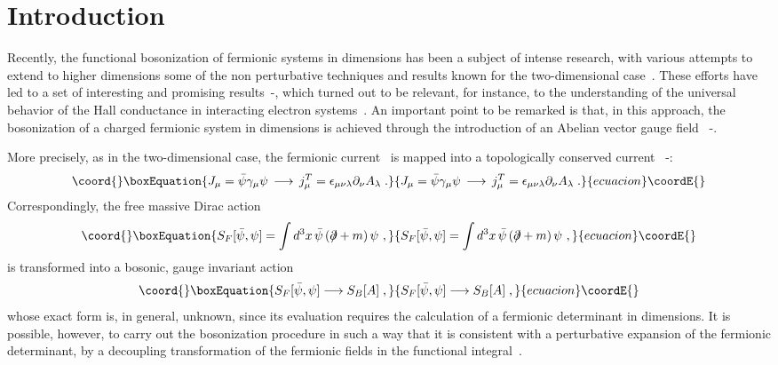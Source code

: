\documentclass[a4paper,12pt]{article}
\begin{document}
\section{Introduction}
Recently, the functional bosonization of fermionic systems in \coordHE{}
dimensions has been a subject of intense research, with various
attempts to extend to higher dimensions some of the non perturbative
techniques and results known for the two-dimensional case~\cite{2b}.
These efforts have led to a set of interesting and promising
results~\cite{result1}-\cite{result6}, which turned out to be
relevant, for instance, to the understanding of the universal behavior
of the Hall conductance in interacting electron systems~\cite{bo}. An
important point to be remarked is that, in this approach, the
bosonization of a charged fermionic system in \mbox{\coordHE{}}
dimensions is achieved through the introduction of an Abelian vector
gauge field \coordHE{}~\cite{result1}-\cite{result7}.

More precisely, as in the two-dimensional case, the \coordHE{} fermionic
current~\mbox{\coordHE{}} is mapped into a topologically
conserved current \coordHE{}~\cite{result1}-\cite{result6}:
\begin{equation}\coord{}\boxEquation{
 \label{bos-curr}
J_\mu =\bar{\psi}\gamma_\mu \psi \,\longrightarrow \,j_\mu^T
=\epsilon_{\mu \nu \lambda}\partial _\nu A_\lambda \;.
}{
 J_\mu =\bar{\psi}\gamma_\mu \psi \,\longrightarrow \,j_\mu^T
=\epsilon_{\mu \nu \lambda}\partial _\nu A_\lambda \;.
}{ecuacion}\coordE{}\end{equation}
Correspondingly, the free massive Dirac action
\begin{equation}\coord{}\boxEquation{
S_F[\bar{\psi },\psi]=\int d^3 x\, \bar\psi \left( \partial \!\!\!/+m \right) \psi \ ,
\label{faction}
}{
S_F[\bar{\psi },\psi]=\int d^3 x\, \bar\psi \left( \partial \!\!\!/+m \right) \psi \ ,
}{ecuacion}\coordE{}\end{equation}
is transformed into a bosonic, gauge invariant action \coordHE{}
\begin{equation}\coord{}\boxEquation{
  \label{act-bos}
S_F[\bar{\psi },\psi]\longrightarrow S_B[A]\;,
}{
  S_F[\bar{\psi },\psi]\longrightarrow S_B[A]\;,
}{ecuacion}\coordE{}\end{equation}
whose exact form is, in general, unknown, since its evaluation
requires the calculation of a fermionic determinant in \coordHE{}
dimensions. It is possible, however, to carry out the bosonization
procedure in such a way that it is consistent with a perturbative
expansion of the fermionic determinant, by a decoupling transformation
of the fermionic fields in the functional
integral~\cite{Fosco:1998gm}.
\end{document}
